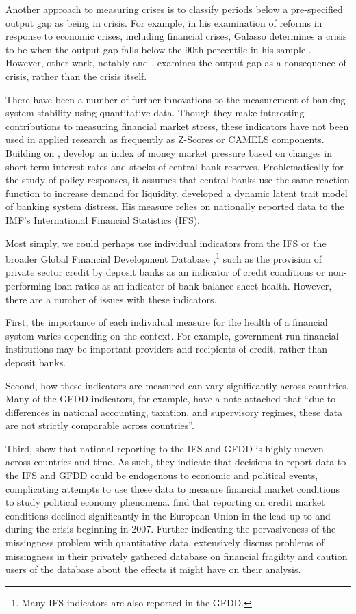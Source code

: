 \documentclass[]{article}
\begin{document}
Another approach to measuring crises is to classify periods below a pre-specified output gap as being in crisis. For example, in his examination of reforms in response to economic crises, including financial crises, Galasso determines a crisis to be when the output gap falls below the 90th percentile in his sample \citeyearpar[154]{galasso2014}. However, other work, notably \cite{laeven2013} and \cite{Reinhart2009}, examines the output gap as a consequence of crisis, rather than the crisis itself.

There have been a number of further innovations to the measurement of banking system stability using quantitative data. Though they make interesting contributions to measuring financial market stress, these indicators have not been used in applied research as frequently as Z-Scores or CAMELS components. Building on \cite{vonHagen2007}, \cite{Jing2015} develop an index of money market pressure based on changes in short-term interest rates and stocks of central bank reserves. Problematically for the study of policy responses, it assumes that central banks use the same reaction function to increase demand for liquidity. \cite{Rosas2009dltm} developed a dynamic latent trait model of banking system distress. His measure relies on nationally reported data to the IMF's International Financial Statistics (IFS).

Most simply, we could perhaps use individual indicators from the IFS or the broader Global Financial Development Database \citep[GFDD,][]{worldbank2015},\footnote{Many IFS indicators are also reported in the GFDD.} such as the provision of private sector credit by deposit banks as an indicator of credit conditions or non-performing loan ratios as an indicator of bank balance sheet health. However, there are a number of issues with these indicators.

First, the importance of each individual measure for the health of a financial system varies depending on the context. For example, government run financial institutions may be important providers and recipients of credit, rather than deposit banks.

Second, how these indicators are measured can vary significantly across countries. Many of the GFDD indicators, for example, have a note attached that ``due to differences in national accounting, taxation, and supervisory regimes, these data are not strictly comparable across countries''.

Third, \cite{GandrudCopHal2015} show that national reporting to the IFS and GFDD is highly uneven across countries and time. As such, they indicate that decisions to report data to the IFS and GFDD could be endogenous to economic and political events, complicating attempts to use these data to measure financial market conditions to study political economy phenomena. \cite{cghBruegel2015} find that reporting on credit market conditions declined significantly in the European Union in the lead up to and during the crisis beginning in 2007. Further indicating the pervasiveness of the missingness problem with quantitative data, \cite{Andrianova2015} extensively discuss problems of missingness in their privately gathered database on financial fragility and caution users of the database about the effects it might have on their analysis.
\end{document}
